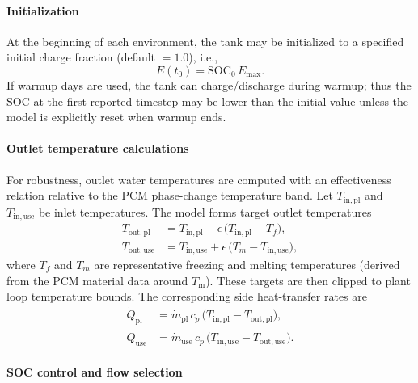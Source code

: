 \paragraph{Initialization}\label{pcm-initialization}

At the beginning of each environment, the tank may be initialized to a specified initial charge fraction (default $=1.0$), i.e.,
\begin{equation}
E(t_0) = \mathrm{SOC}_0 \, E_{\max}.
\end{equation}
If warmup days are used, the tank can charge/discharge during warmup; thus the SOC at the first reported timestep may be lower than the initial value unless the model is explicitly reset when warmup ends.

\paragraph{Outlet temperature calculations}\label{pcm-outlet-temps}

For robustness, outlet water temperatures are computed with an effectiveness relation relative to the PCM phase-change temperature band. Let $T_{\mathrm{in,pl}}$ and $T_{\mathrm{in,use}}$ be inlet temperatures. The model forms target outlet temperatures
\begin{align}
T_{\mathrm{out,pl}} &= T_{\mathrm{in,pl}} - \epsilon \,\bigl(T_{\mathrm{in,pl}} - T_f\bigr), \\
T_{\mathrm{out,use}} &= T_{\mathrm{in,use}} + \epsilon \,\bigl(T_m - T_{\mathrm{in,use}}\bigr),
\end{align}
where $T_f$ and $T_m$ are representative freezing and melting temperatures (derived from the PCM material data around $T_\mathrm{m}$). These targets are then clipped to plant loop temperature bounds. The corresponding side heat-transfer rates are
\begin{align}
\dot Q_{\mathrm{pl}} &= \dot m_{\mathrm{pl}} \, c_p \, \bigl(T_{\mathrm{in,pl}} - T_{\mathrm{out,pl}}\bigr), \\
\dot Q_{\mathrm{use}} &= \dot m_{\mathrm{use}} \, c_p \, \bigl(T_{\mathrm{in,use}} - T_{\mathrm{out,use}}\bigr).
\end{align}

\paragraph{SOC control and flow selection}\label{pcm-control}

